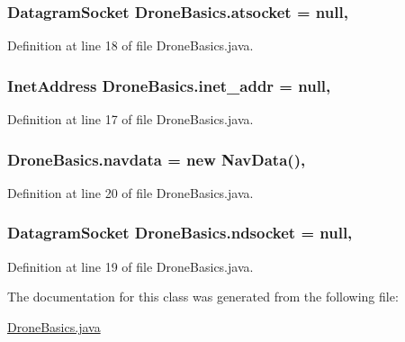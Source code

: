 \subsubsection[{atsocket}]{\setlength{\rightskip}{0pt plus 5cm}Datagram\+Socket Drone\+Basics.\+atsocket = null\hspace{0.3cm}{\ttfamily [static]}, {\ttfamily [private]}}\label{class_drone_basics_adde72319658ee9fcad5d4266cf6c3ec8}


Definition at line 18 of file Drone\+Basics.\+java.

\hypertarget{class_drone_basics_af9aed89eb6bf900c469b8e2dd8a0ba54}{}
\subsubsection[{inet\+\_\+addr}]{\setlength{\rightskip}{0pt plus 5cm}Inet\+Address Drone\+Basics.\+inet\+\_\+addr = null\hspace{0.3cm}{\ttfamily [static]}, {\ttfamily [private]}}\label{class_drone_basics_af9aed89eb6bf900c469b8e2dd8a0ba54}


Definition at line 17 of file Drone\+Basics.\+java.

\hypertarget{class_drone_basics_a3417fe356d9cd027e60d0e2ded680bfd}{}
\subsubsection[{navdata}]{ Drone\+Basics.\+navdata = new {\bf Nav\+Data}()\hspace{0.3cm}{\ttfamily [static]}, {\ttfamily [private]}}\label{class_drone_basics_a3417fe356d9cd027e60d0e2ded680bfd}


Definition at line 20 of file Drone\+Basics.\+java.

\hypertarget{class_drone_basics_a7257f257caa0bb8890ec9b866dad5fdc}{}
\subsubsection[{ndsocket}]{\setlength{\rightskip}{0pt plus 5cm}Datagram\+Socket Drone\+Basics.\+ndsocket = null\hspace{0.3cm}{\ttfamily [static]}, {\ttfamily [private]}}\label{class_drone_basics_a7257f257caa0bb8890ec9b866dad5fdc}


Definition at line 19 of file Drone\+Basics.\+java.



The documentation for this class was generated from the following file\+:\begin{DoxyCompactItemize}
\item 
\hyperlink{_drone_basics_8java}{Drone\+Basics.\+java}\end{DoxyCompactItemize}
